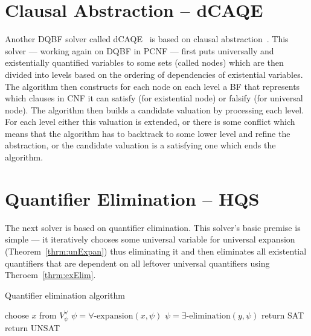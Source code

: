 \documentclass[
  digital, %
  twoside, %
  table,   %
  nolof,     %
  nolot,     %
]{fithesis3}
\theoremstyle{definition}
\theoremstyle{remark}
\begin{document}
\section{Clausal Abstraction -- dCAQE}
Another DQBF solver called dCAQE~\cite{dCAQE} is based on clausal abstraction~\cite{ClausalAbstr}. This solver --- working again on DQBF in PCNF --- first puts universally and existentially quantified variables to some sets (called nodes) which are then divided into levels based on the ordering of dependencies of existential variables. The algorithm then constructs for each node on each level a BF that represents which clauses in CNF it can satisfy (for existential node) or falsify (for universal node). The algorithm then builds a candidate valuation by processing each level. For each level either this valuation is extended, or there is some conflict which means that the algorithm has to backtrack to some lower level and refine the abstraction, or the candidate valuation is a satisfying one which ends the algorithm.



\section{Quantifier Elimination -- HQS}
The next solver is based on quantifier elimination. This solver's basic premise is simple --- it iteratively chooses some universal variable for universal expansion (Theorem~\ref{thrm:unExpan}) thus eliminating it and then eliminates all existential quantifiers that are dependent on all leftover universal quantifiers using Theroem~\ref{thrm:exElim}.

\begin{algorithm}
\caption{Quantifier elimination algorithm}
\label{alg:QE}
\begin{algorithmic}[1]
    \State choose $x$ from $V_{\psi}^{\forall}$
    \State $\psi = \forall\text{-expansion}(x,\psi)$%
        \State $\psi = \exists\text{-elimination}(y,\psi)$%
    \EndFor
\EndWhile
{}
	\State return SAT
\Else
	\State return UNSAT
\EndIf
\EndFunction
\end{algorithmic}
\end{algorithm}
\end{document}
